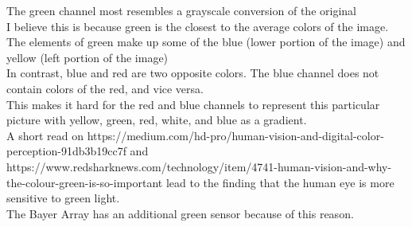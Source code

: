 The green channel most resembles a grayscale conversion of the original \\
I believe this is because green is the closest to the average colors of the image.\\
The elements of green make up some of the blue (lower portion of the image) and yellow (left portion of the image)\\
In contrast, blue and red are two opposite colors. The blue channel does not contain colors of the red, and vice versa.\\
This makes it hard for the red and blue channels to represent this particular picture with yellow, green, red, white, and blue as a gradient.\\
A short read on https://medium.com/hd-pro/human-vision-and-digital-color-perception-91db3b19cc7f
and https://www.redsharknews.com/technology/item/4741-human-vision-and-why-the-colour-green-is-so-important lead to the finding that the human eye is more sensitive to green light.\\
The Bayer Array has an additional green sensor because of this reason. \\
